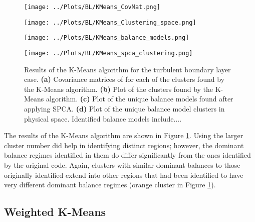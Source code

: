 \documentclass[12pt]{report} %
\begin{document}
\begin{figure}[htbp]
  \centering

  \begin{minipage}{0.7\textwidth}
    \centering
    \texttt{[image: ../Plots/BL/KMeans\_CovMat.png]}
    \subcaption{}
  \end{minipage}

  \begin{minipage}{\textwidth}
      \begin{minipage}[b]{0.6\textwidth}
          \centering
          \texttt{[image: ../Plots/BL/KMeans\_Clustering\_space.png]}
          \subcaption{}
      \end{minipage}
      \begin{minipage}[b]{0.35\textwidth}
          \centering
          \texttt{[image: ../Plots/BL/KMeans\_balance\_models.png]}
          \subcaption{}
      \end{minipage}
  \end{minipage}

  \begin{minipage}{0.7\textwidth}
      \centering
      \texttt{[image: ../Plots/BL/KMeans\_spca\_clustering.png]}
      \subcaption{}
  \end{minipage}
  \caption{Results of the K-Means algorithm for the turbulent boundary layer case. \textbf{(a)} Covariance matrices of for each of the clusters found by the K-Means algorithm. \textbf{(b)} Plot of the clusters found by the K-Means algorithm. \textbf{(c)} Plot of the unique balance models found after applying SPCA. \textbf{(d)} Plot of the unique balance model clusters in physical space. Identified balance models include....}

  \label{fig:KMeans_results}
\end{figure}

The results of the K-Means algorithm are shown in Figure \ref{fig:KMeans_results}. Using the larger cluster number did help in identifying distinct regions; however, the dominant balance regimes identified in them do differ significantly from the ones identified by the original code. Again, clusters with similar dominant balances to those originally identified extend into other regions that had been identified to have very different dominant balance regimes (orange cluster in Figure \ref{fig:KMeans_results}).

\subsection{Weighted K-Means}
\end{document}
